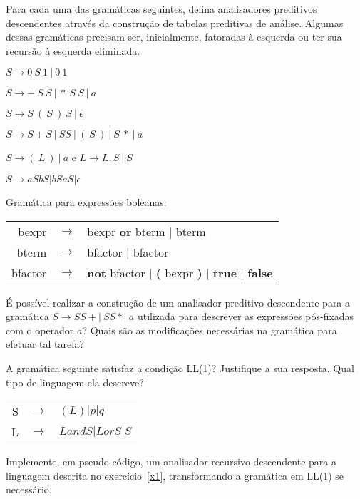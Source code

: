 \documentclass{compiladores}
\begin{document}
\begin{listanumerada}
\item Para cada uma das gramáticas seguintes, defina analisadores
  preditivos descendentes através da construção de tabelas preditivas
  de análise. Algumas dessas gramáticas precisam ser, inicialmente,
  fatoradas à esquerda ou ter sua recursão à esquerda eliminada.
  \begin{lista}
  \item $S \rightarrow 0\ S\ 1\ |\ 0\ 1$
  \item $S \rightarrow +\ S\ S\ |\ *\ S\ S\ |\ a$
  \item $S \rightarrow S\ (\ S\ )\ S\ |\ {\epsilon}$
  \item $S \rightarrow S + S\ |\ SS\ |\ (\ S\ )\ |\ S\ *\ |\ a$
  \item $S \rightarrow (\ L\ )\ |\ a$ e $L \rightarrow L, S\ |\ S$
  \item $S \rightarrow aSbS | bSaS | {\epsilon}$
  \item Gramática para expressões boleanas: \\
    \begin{tabular}{rcl}
      bexpr & $\rightarrow$ & bexpr {\bf or} bterm | bterm \\
      bterm & $\rightarrow$ & bfactor | bfactor \\
      bfactor & $\rightarrow$ & {\bf not} bfactor | {\bf (} bexpr {\bf )} | {\bf true} | {\bf false}
    \end{tabular}
  \end{lista}

\item É possível realizar a construção de um analisador preditivo
  descendente para a gramática $S \rightarrow SS+ |\ SS* |\ a$ utilizada
  para descrever as expressões pós-fixadas com o operador $a$? Quais
  são as modificações necessárias na gramática para efetuar tal tarefa?

\item \label{x1} A gramática seguinte satisfaz a condição LL(1)? Justifique a sua
  resposta. Qual tipo de linguagem ela descreve? \\
    \begin{tabular}{rcl}
      S & $\rightarrow$ & $(L) | p | q$ \\
      L & $\rightarrow$ & $L and S | L or S | S$ \\
    \end{tabular}

\item Implemente, em pseudo-código, um analisador recursivo
  descendente para a linguagem descrita no exercício~\ref{x1},
  transformando a gramática em LL(1) se necessário.


\end{listanumerada}
\end{document}
